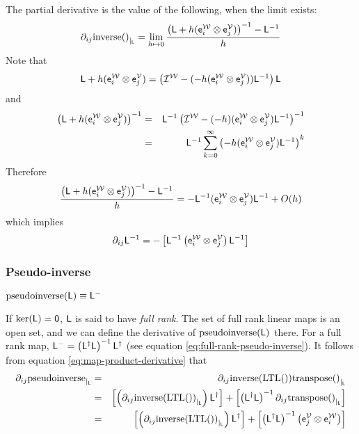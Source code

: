 The partial derivative is the value of the following, when the limit exists:
\begin{displaymath}
{\partial}_{ij}{\mathrm{inverse}()}_{\mid_{\mathsf{L}}}
 =
\lim_{ h \mapsto 0}
\frac{ \left( \mathsf{L} + h (\mathsf{e}_i^{\mathcal{W}} \otimes \mathsf{e}_j^{\mathcal{V}}) \right)^{-1} - \mathsf{L}^{-1} }{h}
\end{displaymath}
Note that
\begin{displaymath}
\mathsf{L} + h (\mathsf{e}_i^{\mathcal{W}} \otimes \mathsf{e}_j^{\mathcal{V}})
 =
\left( \mathcal{I}^{\mathcal{W}} - ( -h ( \mathsf{e}_i^{\mathcal{W}} \otimes \mathsf{e}_j^{\mathcal{V}} )) \mathsf{L}^{-1} \right) \mathsf{L}
\end{displaymath}
and
\begin{eqnarray*}
\left( \mathsf{L} + h (\mathsf{e}_i^{\mathcal{W}} \otimes \mathsf{e}_j^{\mathcal{V}}) \right)^{-1}
& = &
\mathsf{L}^{-1} \left( \mathcal{I}^{\mathcal{W}} - ( -h )( \mathsf{e}_i^{\mathcal{W}} \otimes \mathsf{e}_j^{\mathcal{V}} ) \mathsf{L}^{-1} \right)^{-1}
\\
& = &
\mathsf{L}^{-1} \sum_{k=0}^{\infty} \left( -h ( \mathsf{e}_i^{\mathcal{W}} \otimes \mathsf{e}_j^{\mathcal{V}} ) \mathsf{L}^{-1} \right)^{k}
\nonumber
\end{eqnarray*}
Therefore
\begin{displaymath}
\frac{ \left( \mathsf{L} + h (\mathsf{e}_i^{\mathcal{W}} \otimes \mathsf{e}_j^{\mathcal{V}}) \right)^{-1} - \mathsf{L}^{-1} }{h}
 =
- \mathsf{L}^{-1} ( \mathsf{e}_i^{\mathcal{W}} \otimes \mathsf{e}_j^{\mathcal{V}} )  \mathsf{L}^{-1} + O(h)
\end{displaymath}
which implies
\begin{equation}
{\partial}_{ij}{\mathsf{L}^{-1}}
 =
- \left[
\mathsf{L}^{-1}
\left( \mathsf{e}_i^{\mathcal{W}} \otimes \mathsf{e}_j^{\mathcal{V}} \right)
\mathsf{L}^{-1}
\right]
\end{equation}


\subsubsection{Pseudo-inverse}
\label{sec:Pseudo-inverse}

$\mathrm{pseudoinverse}(\mathsf{L}) \equiv \mathsf{L}^{-}$

If $\mathrm{ker}(\mathsf{L}) = {\mathsf 0}$, $\mathsf{L}$ is said to have {\it full rank}.
The set of full rank linear maps is an open set,
and we can define the derivative of $\mathrm{pseudoinverse}(\mathsf{L})$ there.
For a full rank map,
$\mathsf{L}^{-} = \left( \mathsf{L}^{\dagger} \mathsf{L} \right)^{-1} \mathsf{L}^{\dagger}$
(see equation \ref{eq:full-rank-pseudo-inverse}).
It follows from equation \ref{eq:map-product-derivative} that
\begin{eqnarray}
{\partial}_{ij}{\mathrm{pseudoinverse}}_{\mid_{\mathsf{L}}}
& = &
{\partial}_{ij}{\mathrm{inverse}(\mathrm{LTL}())\mathrm{transpose}()}_{\mid_{\mathsf{L}}}
\\
& = &
\left[
\left( {\partial}_{ij}{\mathrm{inverse}(\mathrm{LTL}())}_{\mid_{\mathsf{L}}} \right)
\mathsf{L}^{\dagger}
\right]
+
\left[
\left( \mathsf{L}^{\dagger} \mathsf{L} \right)^{-1}
{\partial}_{ij}{\mathrm{transpose}()}_{\mid_{\mathsf{L}}}
\right]
\nonumber
\\
& = &
\left[
\left( {\partial}_{ij}{\mathrm{inverse}(\mathrm{LTL}())}_{\mid_{\mathsf{L}}} \right)
\mathsf{L}^{\dagger}
\right]
+
\left[
\left( \mathsf{L}^{\dagger} \mathsf{L} \right)^{-1}
\left( \mathsf{e}_j^{\mathcal{V}} \otimes \mathsf{e}_i^{\mathcal{W}} \right)
\right]
\nonumber
\end{eqnarray}

